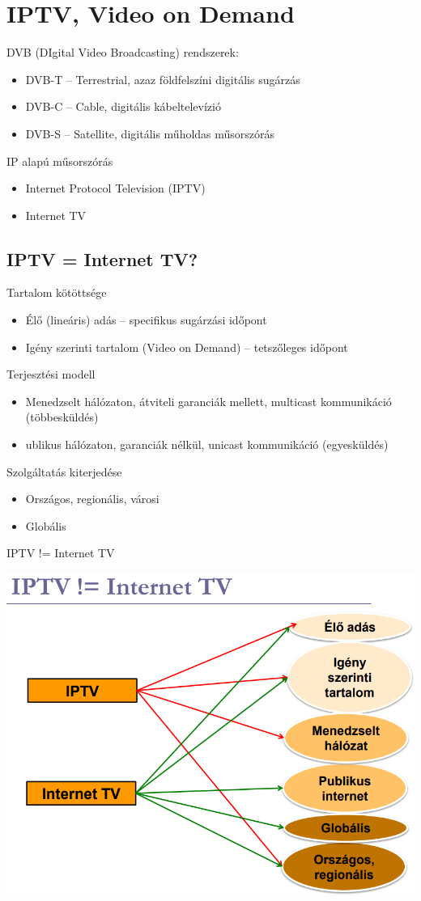 \documentclass[10pt,a4paper]{article}
\begin{document}
\section{IPTV, Video on Demand}
DVB (DIgital Video Broadcasting) rendszerek:
\begin{itemize}
	\item DVB-T – Terrestrial, azaz földfelszíni digitális sugárzás
	\item DVB-C – Cable, digitális kábeltelevízió
	\item DVB-S – Satellite, digitális műholdas műsorszórás
\end{itemize}
IP alapú műsorszórás
\begin{itemize}
	\item Internet Protocol Television (IPTV)
	\item Internet TV
\end{itemize}
\subsection{IPTV = Internet TV?}
Tartalom kötöttsége
\begin{itemize}
	\item Élő (lineáris) adás – specifikus sugárzási időpont
\item Igény szerinti tartalom (Video on Demand) – tetszőleges
időpont
\end{itemize}
Terjesztési modell
\begin{itemize}
	\item Menedzselt hálózaton, átviteli garanciák mellett, multicast
kommunikáció (többesküldés)
\item ublikus hálózaton, garanciák nélkül, unicast
kommunikáció (egyesküldés)
\end{itemize}
Szolgáltatás kiterjedése
\begin{itemize}
	\item Országos, regionális, városi
\item Globális
\end{itemize}
IPTV != Internet TV
\begin{center}
	\includegraphics[width=0.6\linewidth]{src/IPTVInternetTV}
\end{center}
\end{document}
